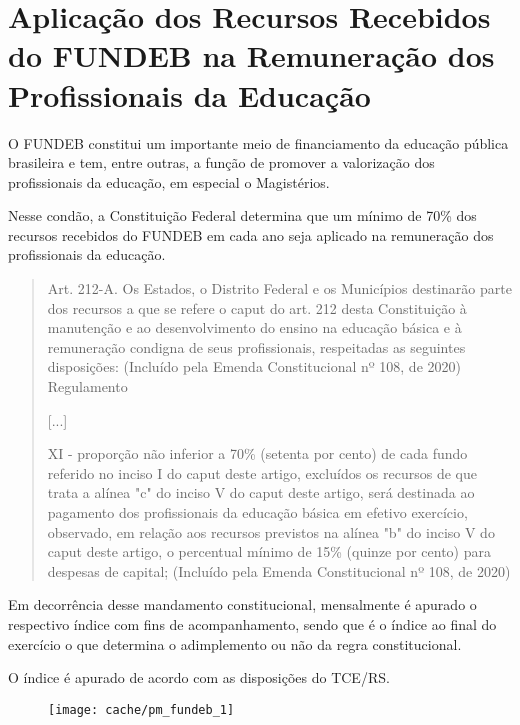 
\section[Aplicação de Recursos do FUNDEB na Remuneração]{Aplicação dos Recursos Recebidos do FUNDEB na Remuneração dos Profissionais da Educação}

O FUNDEB constitui um importante meio de financiamento da educação pública brasileira e tem, entre outras, a função de promover a valorização dos profissionais da educação, em especial o Magistérios.
 
Nesse condão, a Constituição Federal determina que um mínimo de 70\% dos recursos recebidos do FUNDEB em cada ano seja aplicado na remuneração dos profissionais da educação.

\begin{quotation}
Art. 212-A. Os Estados, o Distrito Federal e os Municípios destinarão parte dos recursos a que se refere o caput do art. 212 desta Constituição à manutenção e ao desenvolvimento do ensino na educação básica e à remuneração condigna de seus profissionais, respeitadas as seguintes disposições: (Incluído pela Emenda Constitucional nº 108, de 2020)    Regulamento

[...]

XI - proporção não inferior a 70\% (setenta por cento) de cada fundo referido no inciso I do caput deste artigo, excluídos os recursos de que trata a alínea "c" do inciso V do caput deste artigo, será destinada ao pagamento dos profissionais da educação básica em efetivo exercício, observado, em relação aos recursos previstos na alínea "b" do inciso V do caput deste artigo, o percentual mínimo de 15\% (quinze por cento) para despesas de capital; (Incluído pela Emenda Constitucional nº 108, de 2020)
\end{quotation}

Em decorrência desse mandamento constitucional, mensalmente é apurado o respectivo índice com fins de acompanhamento, sendo que é o índice ao final do exercício o que determina o adimplemento ou não da regra constitucional.



O índice é apurado de acordo com as disposições do TCE/RS.

\begin{figure}[H]
\center
\texttt{[image: cache/pm\_fundeb\_1]}
\end{figure}

